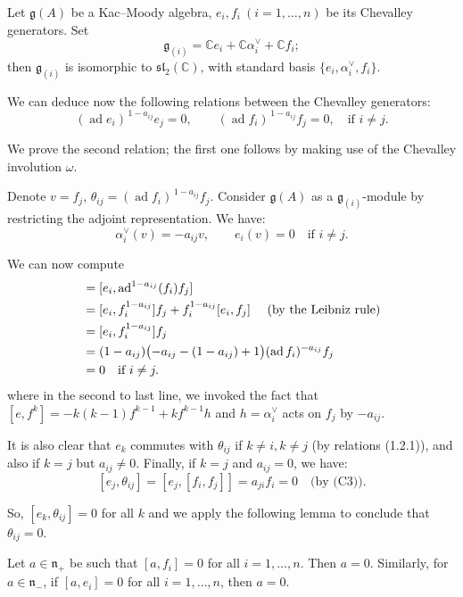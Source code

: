 \documentclass[12pt]{article}
\begin{document}
\begin{example}
    Let $\mathfrak{g}(A)$ be a Kac--Moody algebra, $e_i, f_i \ (i=1,\dots,n)$ be
    its Chevalley generators. Set
    \[
        \mathfrak{g}_{(i)} = \mathbb{C}e_i + \mathbb{C}\alpha_i^\vee + \mathbb{C}f_i;
    \]
    then $\mathfrak{g}_{(i)}$ is isomorphic to $\mathfrak{sl}_2(\mathbb{C})$, with standard basis
    $\{e_i, \alpha_i^\vee, f_i\}$.

    We can deduce now the following relations between the Chevalley generators:
    \begin{equation}\label{eq:Serre}
        (\operatorname{ad} e_i)^{\,1-a_{ij}} e_j = 0,
        \qquad
        (\operatorname{ad} f_i)^{\,1-a_{ij}} f_j = 0,
        \quad \text{if } i \neq j.
    \end{equation}

    We prove the second relation; the first one follows by making use of the
    Chevalley involution $\omega$.

    Denote $v = f_j$, $\theta_{ij} = (\operatorname{ad} f_i)^{\,1-a_{ij}} f_j$.
    Consider $\mathfrak{g}(A)$ as a $\mathfrak{g}_{(i)}$-module by restricting the adjoint representation. We have:
    \[
        \alpha_i^\vee(v) = -a_{ij} v,
        \qquad
        e_i(v) = 0 \quad \text{if } i \neq j.
    \]

    We can now compute \begin{align*}
        [e_i, \theta_{ij}] & = [e_i, \ad^{1-a_{ij}}(f_i) f_j]                                                       \\
                           & = [e_i, f_i^{1-a_{ij}}] f_j + f_i^{1-a_{ij}} [e_i, f_j] \texty{ (by the Leibniz rule)} \\
                           & = [e_i, f_i^{1-a_{ij}}] f_j                                                            \\
                           & = (1-a_{ij})\bigl(-a_{ij} - (1-a_{ij})+1 \bigr)(\operatorname{ad} f_i)^{-a_{ij}} f_j   \\
                           & = 0 \quad \text{if } i \neq j.
    \end{align*}
    where in the second to last line, we invoked the fact that $[e,f^k] = -k(k-1) f^{k-1} + k f^{k-1} h$ and $h = \alpha_i^\vee$ acts on $f_j$ by $-a_{ij}$.

    It is also clear that $e_k$ commutes with $\theta_{ij}$ if $k \neq i, k \neq j$
    (by relations (1.2.1)), and also if $k=j$ but $a_{ij} \neq 0$. Finally, if $k=j$ and $a_{ij}=0$, we have:
    \[
        [e_j, \theta_{ij}] = [e_j, [f_i,f_j]] = a_{ji} f_i = 0
        \quad \text{(by (C3))}.
    \]

    So, $[e_k, \theta_{ij}] = 0$ for all $k$ and we apply the following lemma to conclude that $\theta_{ij} = 0$.
\end{example}
\begin{lemma}
    Let $a \in \mathfrak{n}_+$ be such that $[a,f_i] = 0$ for all $i=1,\dots,n$.
    Then $a=0$. Similarly, for $a \in \mathfrak{n}_-$, if $[a,e_i] = 0$ for all
    $i=1,\dots,n$, then $a=0$.
\end{lemma}
\end{document}

